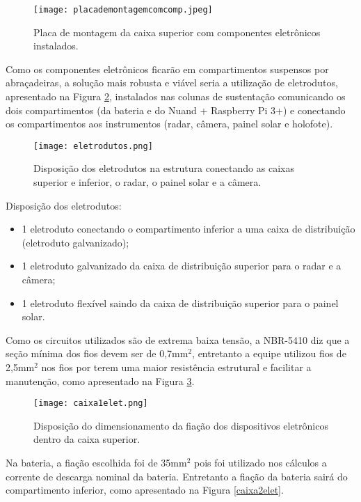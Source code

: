 \begin{figure}[h]
	\centering
    \texttt{[image: placademontagemcomcomp.jpeg]}
    \caption{Placa de montagem da caixa superior com componentes eletrônicos instalados.}
    \label{circ}
\end{figure}


Como os componentes eletrônicos ficarão em compartimentos suspensos por abraçadeiras, a solução mais robusta e viável seria a utilização de eletrodutos, apresentado na Figura \ref{eletrod}, instalados nas colunas de sustentação comunicando os dois compartimentos (da bateria e do Nuand + Raspberry Pi 3+) e conectando os compartimentos aos instrumentos (radar, câmera, painel solar e holofote).

\begin{figure}[h]
	\centering
    \texttt{[image: eletrodutos.png]}
    \caption{Disposição dos eletrodutos na estrutura conectando as caixas superior e inferior, o radar, o painel solar e a câmera.}
    \label{eletrod}
\end{figure}

Disposição dos eletrodutos:

\begin{itemize}
\item 1 eletroduto conectando o compartimento inferior a uma caixa de distribuição (eletroduto galvanizado);
\item 1 eletroduto galvanizado da caixa de distribuição superior para o radar e a câmera;
\item 1 eletroduto flexível saindo da caixa de distribuição superior para o painel solar.
\end{itemize}

Como os circuitos utilizados são de extrema baixa tensão, a NBR-5410 \cite{protecao} diz que a seção mínima dos fios devem ser de 0,7mm$^2$, entretanto a equipe utilizou fios de 2,5mm$^2$ nos fios por terem uma maior resistência estrutural e facilitar a manutenção, como apresentado na Figura \ref{caixa1elet}.
\newpage
\begin{figure}[h]
	\centering
    \texttt{[image: caixa1elet.png]}
    \caption{Disposição do dimensionamento da fiação dos dispositivos eletrônicos dentro da caixa superior.}
    \label{caixa1elet}
\end{figure}


 Na bateria, a fiação escolhida foi de 35mm$^2$ pois foi utilizado nos cálculos a corrente de descarga nominal da bateria. Entretanto a fiação da bateria sairá do compartimento inferior, como apresentado na Figura \ref{caixa2elet}.

